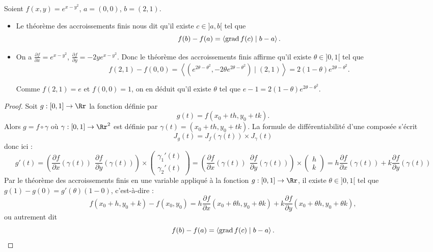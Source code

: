 \documentclass[11pt, class=report,crop=false]{standalone}
\begin{document}
\begin{exemple}
Soient $f(x,y) = e^{x-y^2}$, $a = (0,0)$, $b=(2,1)$.
\begin{itemize} 
  \item Le théorème des accroissements finis nous dit qu'il existe $c \in ]a,b[$ tel que 
$$f(b)-f(a) = \left\langle \operatorname{grad} f (c) \mid b-a \right\rangle.$$

  \item On a   $\frac{\partial f}{\partial x} = e^{x-y^2}$, 
$\frac{\partial f}{\partial y} = -2ye^{x-y^2}$.
  Donc le théorème des accroissements finis affirme qu'il existe $\theta \in ]0,1[$ tel que
  $$f(2,1)-f(0,0) = \left\langle (e^{2\theta-\theta^2},-2\theta e^{2\theta-\theta^2}) \mid (2,1) \right\rangle
   = 2(1-\theta)e^{2\theta-\theta^2}.$$
  
Comme $f(2,1) = e$ et $f(0,0)=1$, on en déduit qu'il existe $\theta$ tel que $e-1= 2(1-\theta)e^{2\theta-\theta^2}$.
  
\end{itemize}


\end{exemple}

\begin{proof}
Soit $g : [0,1] \to \Rr$ la fonction définie par 
$$g(t) = f(x_0+th,y_0+tk).$$
Alors $g = f \circ \gamma$ où $\gamma : [0,1] \to \Rr^2$ est définie par $\gamma(t) = (x_0+th,y_0+tk)$.
La formule de différentiabilité d'une composée s'écrit 
$$J_g(t) = J_f (\gamma(t)) \times J_\gamma(t)$$
donc ici :
$$g'(t) = \left(\frac{\partial f}{\partial x}(\gamma(t)) \ \ 
\frac{\partial f}{\partial y}(\gamma(t)) \right) \times 
\begin{pmatrix}
\gamma_1'(t)\\
\gamma_2'(t)
\end{pmatrix}
= \left(\frac{\partial f}{\partial x}(\gamma(t)) \ \ 
\frac{\partial f}{\partial y}(\gamma(t)) \right) \times 
\begin{pmatrix}
h\\
k 
\end{pmatrix}
= h\frac{\partial f}{\partial x}(\gamma(t)) + k  \frac{\partial f}{\partial y}(\gamma(t))$$
Par le théorème des accroissements finis en une variable appliqué à la fonction $g : [0,1] \to \Rr$, il existe $\theta \in ]0,1[$ tel que $g(1)-g(0) = g'(\theta)(1-0)$, c'est-à-dire :
$$f(x_0+h,y_0+k) - f(x_0,y_0) = h\frac{\partial f}{\partial x}(x_0+\theta h,y_0+\theta k)
+k\frac{\partial f}{\partial y}(x_0+\theta h,y_0+\theta k),$$ 
ou autrement dit
$$f(b)-f(a) = \left\langle \operatorname{grad} f (c) \mid b-a \right\rangle.$$
\end{proof}
\end{document}
